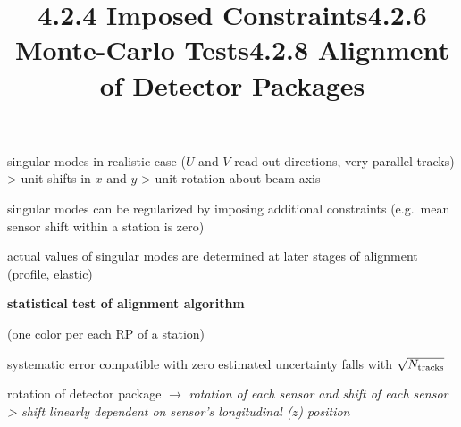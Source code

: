 \> singular modes in realistic case ($U$ and $V$ read-out directions, very parallel tracks)
\>> unit shifts in $x$ and $y$
\>> unit rotation about beam axis


\vfil
\title{4.2.4 Imposed Constraints}
\vskip-3mm

\> singular modes can be regularized by imposing additional constraints (e.g.~mean sensor shift within a station is zero)

\> actual values of singular modes are determined at later stages of alignment (profile, elastic)

\newpage%
\title{4.2.6 Monte-Carlo Tests}

\centerline{\bf statistical test of alignment algorithm}
\centerline{(one color per each RP of a station)}


\> systematic error compatible with zero
\> estimated uncertainty falls with $\sqrt{N_{\rm tracks}}$

\newpage%
\title{4.2.8 Alignment of Detector Packages}
\vskip-3mm

\> rotation of detector package $\longrightarrow$ \em{rotation} of each sensor and \em{shift} of each sensor
\>> shift linearly dependent on sensor's longitudinal ($z$) position

